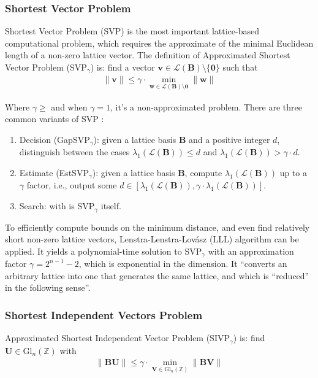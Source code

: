\subsubsection{Shortest Vector Problem}
\par Shortest Vector Problem (SVP) is the most important lattice-based computational problem, which requires the approximate of the minimal Euclidean length of a non-zero lattice vector. The definition of Approximated Shortest Vector Problem (SVP$_{\gamma}$) is: find a vector $\mathbf{v} \in \mathcal{L}(\mathbf{B}) \setminus \{\mathbf{0}\}$ such that
\begin{align*}
\|\mathbf{v}\| \leq \gamma \cdot \min_{\mathbf{w} \in \mathcal{L}(\mathbf{B})\setminus\mathbf{0}}  \|\mathbf{w}\|
\end{align*}
\par Where $\gamma \geq$ and when $\gamma = 1$, it's a non-approximated problem. There are three common variants of SVP \cite{Peikert}:
\begin{enumerate}
\item Decision (GapSVP$_{\gamma}$): given a lattice basis $\mathbf{B}$ and a positive integer $d$, distinguish between the cases $\lambda_{1}(\mathcal{L}(\mathbf{B})) \leq d$ and $\lambda_{1}(\mathcal{L}(\mathbf{B})) > \gamma \cdot d$.
\item Estimate (EstSVP$_{\gamma}$): given a lattice basis $\mathbf{B}$, compute $\lambda_{1}(\mathcal{L}(\mathbf{B}))$ up to a $\gamma$ factor, i.e., output some $d \in [\lambda_{1}(\mathcal{L}(\mathbf{B})), \gamma \cdot \lambda_{1}(\mathcal{L}(\mathbf{B}))]$.
\item Search: with is SVP$_{\gamma}$ itself.
\end{enumerate}
\par To efficiently compute bounds on the minimum distance, and even find relatively short non-zero lattice vectors, Lenstra-Lenstra-Lov\'{a}sz (LLL) algorithm can be applied. It yields a polynomial-time solution to SVP$_{\gamma}$  with an approximation factor $\gamma = 2^{n-1}-2$, which is exponential in the dimension. It ``converts an arbitrary lattice into one that generates the same lattice, and which is “reduced” in the following sense''\cite{Peikert}.

\subsubsection{Shortest Independent Vectors Problem}
\par Approximated Shortest Independent Vector Problem (SIVP$_{\gamma}$) is: find $\mathbf{U}\in \mathrm{Gl}_{n}(\mathbb{Z})$ with
\begin{align*}
\|\mathbf{B}\mathbf{U}\| \leq \gamma \cdot \min_{\mathbf{V}\in \mathrm{Gl}_{n}(\mathbb{Z})} \|\mathbf{B}\mathbf{V}\|
\end{align*}

